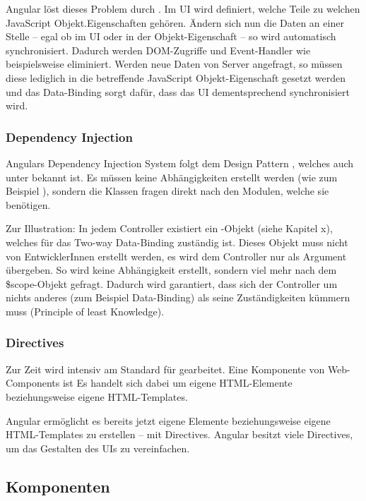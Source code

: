 Angular löst dieses Problem durch . Im UI wird definiert, welche Teile zu welchen JavaScript Objekt.Eigenschaften gehören. Ändern sich nun die Daten an einer Stelle -- egal ob im UI oder in der Objekt-Eigenschaft -- so wird automatisch synchronisiert. Dadurch werden DOM-Zugriffe und Event-Handler wie beispielsweise  eliminiert. Werden neue Daten von Server angefragt, so müssen diese lediglich in die betreffende JavaScript Objekt-Eigenschaft gesetzt werden und das Data-Binding sorgt dafür, dass das UI dementsprechend synchronisiert wird.

\subsubsection{Dependency Injection}
Angulars Dependency Injection System folgt dem Design Pattern , welches auch unter  bekannt ist. Es müssen keine Abhängigkeiten erstellt werden (wie zum Beispiel ), sondern die Klassen fragen direkt nach den Modulen, welche sie benötigen.

Zur Illustration: In jedem Controller existiert ein -Objekt (siehe Kapitel x), welches für das Two-way Data-Binding zuständig ist. Dieses Objekt muss nicht von EntwicklerInnen erstellt werden, es wird dem Controller nur als Argument übergeben. So wird keine Abhängigkeit erstellt, sondern viel mehr nach dem \$scope-Objekt gefragt. Dadurch wird garantiert, dass sich der Controller um nichts anderes (zum Beispiel Data-Binding) als seine Zuständigkeiten kümmern muss (Principle of least Knowledge).

\subsubsection{Directives}
Zur Zeit wird intensiv am Standard für  gearbeitet. Eine Komponente von Web-Components ist  Es handelt sich dabei um eigene HTML-Elemente beziehungsweise eigene HTML-Templates.

Angular ermöglicht es bereits jetzt eigene Elemente beziehungsweise eigene HTML-Templates zu erstellen -- mit Directives. Angular besitzt viele Directives, um das Gestalten des UIs zu vereinfachen.

\subsection{Komponenten}
